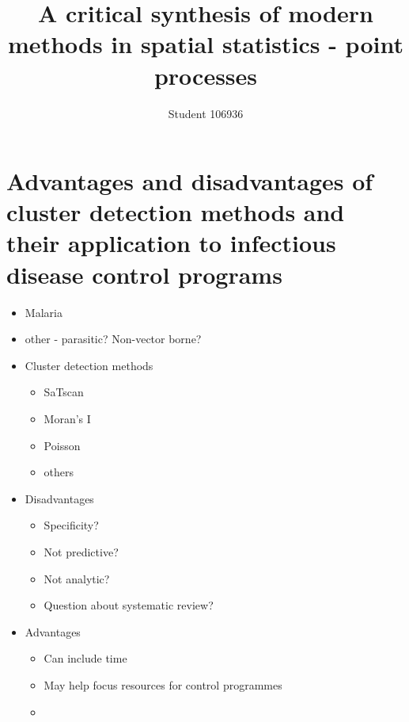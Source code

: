 \documentclass[a4paper,11pt]{article}
\title{A critical synthesis of modern methods in spatial statistics - point processes}
\author{Student 106936}
\begin{document}
\maketitle



\section{Advantages and disadvantages of cluster detection methods and their application to infectious disease control programs}
\begin{itemize}
 \item Malaria
 \item other - parasitic? Non-vector borne?
\end{itemize}

\begin{itemize}
 \item Cluster detection methods 
 \begin{itemize}
  \item SaTscan
  \item Moran's I
  \item Poisson
  \item others
 \end{itemize}
 \item Disadvantages
 \begin{itemize}
  \item Specificity?
  \item Not predictive?
  \item Not analytic?
  \item Question about systematic review?
 \end{itemize}
 \item Advantages
 \begin{itemize}
  \item Can include time
  \item May help focus resources for control programmes
  \item 
 \end{itemize}

\end{itemize}
\end{document}
